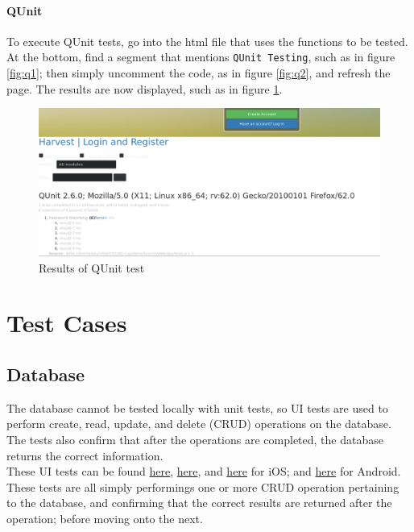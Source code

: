 \documentclass[12pt]{article}
\begin{document}
\paragraph{QUnit} To execute QUnit tests, go into the html file that uses the functions to be tested. At the bottom, find a segment that mentions \texttt{QUnit Testing}, such as in figure \ref{fig:q1}; then simply uncomment the code, as in figure \ref{fig:q2}, and refresh the page. The results are now displayed, such as in figure \ref{fig:qr}.

\begin{figure}
\includegraphics[width=\textwidth]{images/qr.png}
\caption{Results of QUnit test}
\label{fig:qr}
\end{figure}

\section{Test Cases}
\subsection{Database}
The database cannot be tested locally with unit tests, so UI tests are used to perform create, read, update, and delete (CRUD) operations on the database. The tests also confirm that after the operations are completed, the database returns the correct information.\\
\indent These UI tests can be found \href{https://github.com/BinaryNinjaz/COS301-Capstone/blob/master/Source/iOS/Harvest/HarvestUITests/HarvestEntityCreationUITests.swift}{here}, \href{https://github.com/BinaryNinjaz/COS301-Capstone/blob/master/Source/iOS/Harvest/HarvestTests/HarvestTests.swift}{here}, and \href{https://github.com/BinaryNinjaz/COS301-Capstone/blob/master/Source/iOS/Harvest/HarvestUITests/HarvestEntityDeletionUITests.swift}{here} for iOS; and \href{https://github.com/BinaryNinjaz/COS301-Capstone/blob/master/Source/Android/Harvest/app/src/androidTest/java/za/org/samac/harvest/InformationTest.java}{here} for Android. These tests are all simply performings one or more CRUD operation pertaining to the database, and confirming that the correct results are returned after the operation; before moving onto the next.
\end{document}
